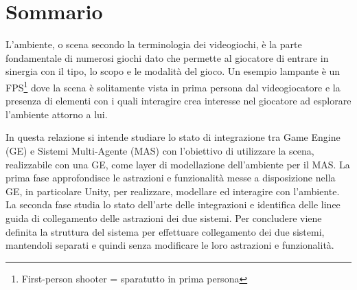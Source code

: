 \chapter{Sommario}

L'ambiente, o scena secondo la terminologia dei videogiochi, è la parte fondamentale di numerosi giochi dato che permette al giocatore di entrare in sinergia con il tipo, lo scopo e le modalità del gioco. Un esempio lampante è un FPS\footnote{First-person shooter = sparatutto in prima persona} dove la scena è solitamente vista in prima persona dal videogiocatore e la presenza di elementi con i quali interagire crea interesse nel giocatore ad esplorare l'ambiente attorno a lui.

\medskip

In questa relazione si intende studiare lo stato di integrazione tra Game Engine (GE) e Sistemi Multi-Agente (MAS) con l'obiettivo di utilizzare la scena, realizzabile con una GE, come layer di modellazione dell'ambiente per il MAS. La prima fase approfondisce le astrazioni e funzionalità messe a disposizione nella GE, in particolare Unity, per realizzare, modellare ed interagire con l'ambiente. La seconda fase studia lo stato dell'arte delle integrazioni e identifica delle linee guida di collegamento delle astrazioni dei due sistemi.
Per concludere viene definita la struttura del sistema per effettuare collegamento dei due sistemi, mantendoli separati e quindi senza modificare le loro astrazioni e funzionalità.